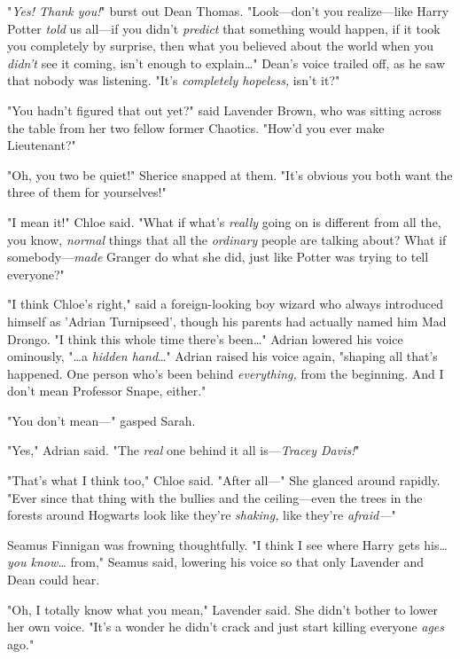 "\emph{Yes! Thank you!}" burst out Dean Thomas. "Look---don't you 
realize---like Harry Potter \emph{told} us all---if you didn't \emph{predict} 
that something would happen, if it took you completely by surprise, then what 
you believed about the world when you \emph{didn't} see it coming, isn't enough 
to explain{\ldots}" Dean's voice trailed off, as he saw that nobody was 
listening. "It's \emph{completely hopeless,} isn't it?"

"You hadn't figured that out yet?" said Lavender Brown, who was sitting across 
the table from her two fellow former Chaotics. "How'd you ever make Lieutenant?"

"Oh, you two be quiet!" Sherice snapped at them. "It's obvious you both want 
the three of them for yourselves!"

"I mean it!" Chloe said. "What if what's \emph{really} going on is different 
from all the, you know, \emph{normal} things that all the \emph{ordinary} 
people are talking about? What if somebody---\emph{made} Granger do what she 
did, just like Potter was trying to tell everyone?"

"I think Chloe's right," said a foreign-looking boy wizard who always 
introduced himself as 'Adrian Turnipseed', though his parents had actually 
named him Mad Drongo. "I think this whole time there's been{\ldots}" Adrian 
lowered his voice ominously, "{\ldots}a \emph{hidden hand}{\ldots}" Adrian 
raised his voice again, "shaping all that's happened. One person who's been 
behind \emph{everything,} from the beginning. And I don't mean Professor Snape, 
either."

"You don't mean---" gasped Sarah.

"Yes," Adrian said. "The \emph{real} one behind it all is---\emph{Tracey 
Davis!}"

"That's what I think too," Chloe said. "After all---" She glanced around 
rapidly. "Ever since that thing with the bullies and the ceiling---even the 
trees in the forests around Hogwarts look like they're \emph{shaking,} like 
they're \emph{afraid---}"

Seamus Finnigan was frowning thoughtfully. "I think I see where Harry gets 
his{\ldots} \emph{you know{\ldots}} from," Seamus said, lowering his voice so 
that only Lavender and Dean could hear.

"Oh, I totally know what you mean," Lavender said. She didn't bother to lower 
her own voice. "It's a wonder he didn't crack and just start killing everyone 
\emph{ages} ago."


